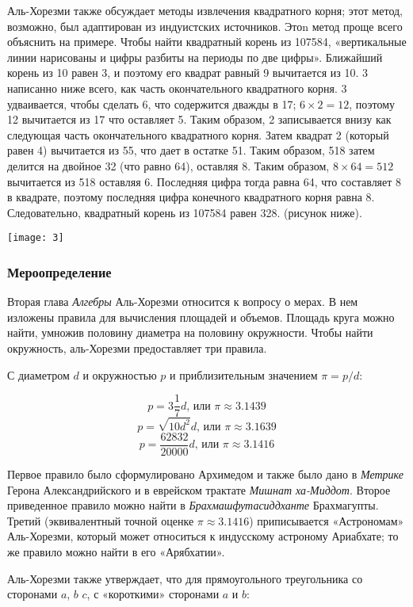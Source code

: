 Аль-Хорезми также обсуждает методы извлечения квадратного корня; этот метод, возможно, был адаптирован из индуистских источников. Этоn метод проще всего объяснить на примере. Чтобы найти квадратный корень из 107584, «вертикальные линии нарисованы и цифры разбиты на периоды по две цифры». Ближайший корень из 10 равен 3, и поэтому его квадрат равный 9 вычитается из 10. 3 написанно ниже всего, как часть окончательного квадратного корня. 3 удваивается, чтобы сделать 6, что содержится дважды в 17; $6 \times 2 = 12$, поэтому 12 вычитается из 17 что оставляет 5. Таким образом, 2 записывается внизу как следующая часть окончательного квадратного корня. Затем квадрат 2 (который равен 4) вычитается из 55, что дает в остатке 51. Таким образом, 518 затем делится на двойное 32 (что равно 64), оставляя 8. Таким образом, $8 \times 64 = 512$ вычитается из 518 оставляя 6. Последняя цифра тогда равна 64, что составляет 8 в квадрате, поэтому последняя цифра конечного квадратного корня равна 8. Следовательно, квадратный корень из 107584 равен 328. (рисунок ниже).

\texttt{[image: 3]}

\subsubsection{Мероопределение}
Вторая глава \textit{Алгебры} Аль-Хорезми относится к вопросу о мерах. В нем изложены правила для вычисления площадей и объемов. Площадь круга можно найти, умножив половину диаметра на половину окружности. Чтобы найти окружность, аль-Хорезми предоставляет три правила.

С диаметром $d$ и окружностью $p$ и приблизительным значением $\pi = p / d$:

$$p = 3\frac{1}{7}d\textrm{, или } \pi \approx 3.1439$$
$$p = \sqrt{10d^2}d\textrm{, или } \pi \approx 3.1639$$
$$p = \frac{62832}{20000}d\textrm{, или } \pi \approx 3.1416$$

Первое правило было сформулировано Архимедом и также было дано в \textit{Метрике} Герона Александрийского и в еврейском трактате \textit{Мишнат ха-Миддот}. Второе приведенное правило можно найти в \textit{Брахмашфутасиддханте} Брахмагупты. Третий (эквивалентный точной оценке $\pi \approx 3.1416$) приписывается «Астрономам» Аль-Хорезми, который может относиться к индусскому астроному Ариабхате; то же правило можно найти в его «Арябхатии».

Аль-Хорезми также утверждает, что для прямоугольного треугольника со сторонами $a$, $b$ $c$, с «короткими» сторонами $a$ и $b$:

